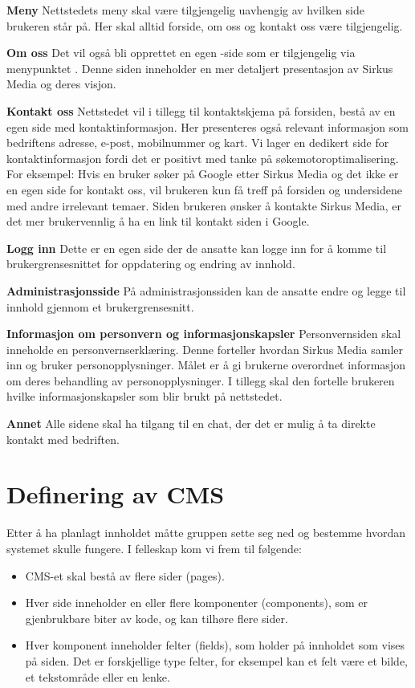 \textbf{Meny} Nettstedets meny skal være tilgjengelig uavhengig av hvilken side brukeren står på. Her skal alltid forside, om oss og kontakt oss være tilgjengelig. 

\textbf{Om oss} Det vil også bli opprettet en egen -side som er tilgjengelig via menypunktet . Denne siden inneholder en mer detaljert presentasjon av Sirkus Media og deres visjon.

\textbf{Kontakt oss} Nettstedet vil i tillegg til kontaktskjema på forsiden, bestå av en egen side med kontaktinformasjon. Her presenteres også relevant informasjon som bedriftens adresse, e-post, mobilnummer og kart. Vi lager en dedikert side for kontaktinformasjon fordi det er positivt med tanke på søkemotoroptimalisering. For eksempel: Hvis en bruker søker på Google etter Sirkus Media og det ikke er en egen side for kontakt oss, vil brukeren kun få treff på forsiden og undersidene med andre irrelevant temaer. Siden brukeren ønsker å kontakte Sirkus Media, er det mer brukervennlig å ha en link til kontakt siden i Google.

\textbf{Logg inn} Dette er en egen side der de ansatte kan logge inn for å komme til brukergrensesnittet for oppdatering og endring av innhold.

\textbf{Administrasjonsside}  På administrasjonssiden kan de ansatte endre og legge til innhold gjennom et brukergrensesnitt.

\textbf{Informasjon om personvern og informasjonskapsler} Personvernsiden skal inneholde en personvernserklæring. Denne forteller hvordan Sirkus Media samler inn og bruker personopplysninger. Målet er å gi brukerne overordnet informasjon om deres behandling av personopplysninger. I tillegg skal den fortelle brukeren hvilke informasjonskapsler som blir brukt på nettstedet.

\textbf{Annet} Alle sidene skal ha tilgang til en chat, der det er mulig å ta direkte kontakt med bedriften.

\section{Definering av CMS}
\label{sec-planning-cms}
Etter å ha planlagt innholdet måtte gruppen sette seg ned og bestemme hvordan systemet skulle fungere. I felleskap kom vi frem til følgende:

\begin{itemize}
\item CMS-et skal bestå av flere sider (pages).
\item Hver side inneholder en eller flere komponenter (components), som er gjenbrukbare biter av kode, og kan tilhøre flere sider.
\item Hver komponent inneholder felter (fields), som holder på innholdet som vises på siden. Det er forskjellige type felter, for eksempel kan et felt være et bilde, et tekstområde eller en lenke. 
\end{itemize}

